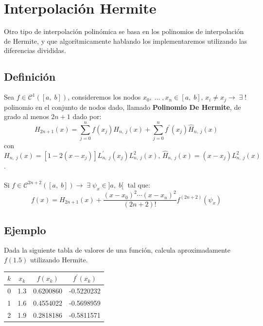 \documentclass[12pt,a4paper,oneside]{scrbook}
\newcounter{ns}
\begin{document}
\section{Interpolación Hermite}
Otro tipo de interpolación polinómica se basa en los polinomios de interpolación de Hermite, y que algorítmicamente hablando los implementaremos utilizando las diferencias divididas.
\subsection*{Definición}
Sea $f\in\mathcal{C}^1([a,\;b])$, consideremos los nodos $x_0,\;\dots\;,x_n\in [a,\;b],\,x_i\neq x_j\rightarrow\;\exists\;!\;$ polinomio en el conjunto de nodos dado, llamado \textbf{Polinomio De Hermite}, de grado al menos $2n+1$ dado por:
\[
H_{2n+1}(x)=\sum\limits_{j=0}^n f(x_j)H_{n,\; j}(x)+\sum\limits_{j=0}^n f^\prime (x_j)\hat{H}_{n,\; j}(x)
\]
con $H_{n,\; j}(x)=[1-2(x-x_j)]L^\prime _{n,\; j}(x_j)L^2_{n,\; j}(x),\,\hat{H}_{n,\; j}(x)=(x-x_j)L^2_{n,\; j}(x)$.\\ \\
Si $f\in\mathcal{C}^{2n+2}([a,\;b])\rightarrow\;\exists\;\psi_x\in ]a,\;b[\;$ tal que:
\[
f(x)=H_{2n+1}(x)+\dfrac{(x-x_0)^2\cdots (x-x_n)^2}{(2n+2)!}f^{(2n+2)}(\psi_x)
\]
\subsection*{Ejemplo}
Dada la siguiente tabla de valores de una función, calcula aproximadamente $f(1.5)$ utilizando Hermite.
\begin{center}
    \begin{tabular}{|c||c|c|c|}
        \hline
        $k$  & $x_k$ & $f(x_k)$  & $f^\prime (x_k)$\\ \hline
        0    & 1.3   & 0.6200860 & -0.5220232 \\ \hline
        1    & 1.6   & 0.4554022 & -0.5698959 \\ \hline
        2    & 1.9   & 0.2818186 & -0.5811571 \\ \hline
    \end{tabular}
\end{center}
\end{document}

